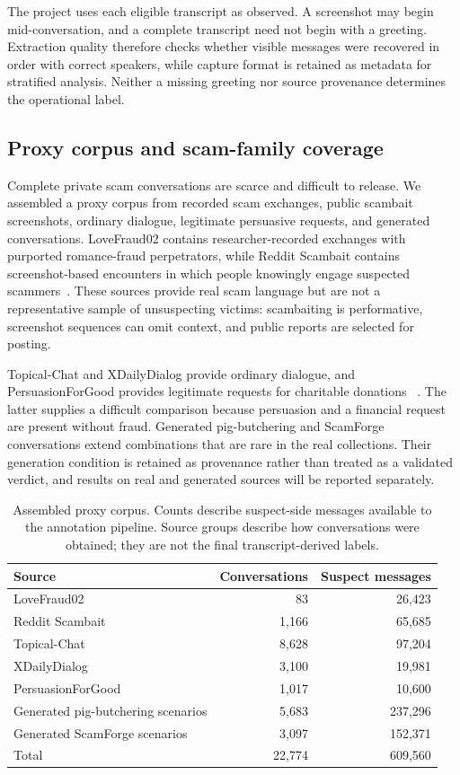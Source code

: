 \documentclass[letterpaper,11pt]{article}
\begin{document}
The project uses each eligible transcript as observed. A screenshot may begin
mid-conversation, and a complete transcript need not begin with a greeting.
Extraction quality therefore checks whether visible messages were recovered in
order with correct speakers, while capture format is retained as metadata for
stratified analysis. Neither a missing greeting nor source provenance determines
the operational label.

\subsection{Proxy corpus and scam-family coverage}
Complete private scam conversations are scarce and difficult to release. We
assembled a proxy corpus from recorded scam exchanges, public scambait screenshots,
ordinary dialogue, legitimate persuasive requests, and generated conversations.
LoveFraud02 contains researcher-recorded exchanges with purported romance-fraud
perpetrators, while Reddit Scambait contains screenshot-based encounters in which
people knowingly engage suspected scammers~\cite{faber2024lovefraud02,lu2026readthis}.
These sources provide real scam language but are not a representative sample of
unsuspecting victims: scambaiting is performative, screenshot sequences can omit
context, and public reports are selected for posting.

Topical-Chat and XDailyDialog provide ordinary dialogue, and PersuasionForGood
provides legitimate requests for charitable donations
~\cite{gopalakrishnan2019topical,li2017dailydialog,wang2019persuasion}.
The latter supplies a difficult comparison because persuasion and a financial
request are present without fraud. Generated pig-butchering and ScamForge
conversations extend combinations that are rare in the real collections. Their
generation condition is retained as provenance rather than treated as a validated
verdict, and results on real and generated sources will be reported separately.

\begin{table}[tb]
\centering\small
\begin{tabularx}{\linewidth}{@{}Xrr@{}}
\toprule
Source & Conversations & Suspect messages \\
\midrule
LoveFraud02 & 83 & 26,423 \\
Reddit Scambait & 1,166 & 65,685 \\
Topical-Chat & 8,628 & 97,204 \\
XDailyDialog & 3,100 & 19,981 \\
PersuasionForGood & 1,017 & 10,600 \\
Generated pig-butchering scenarios & 5,683 & 237,296 \\
Generated ScamForge scenarios & 3,097 & 152,371 \\
\midrule
Total & 22,774 & 609,560 \\
\bottomrule
\end{tabularx}
\caption{Assembled proxy corpus. Counts describe suspect-side messages available
to the annotation pipeline. Source groups describe how conversations were
obtained; they are not the final transcript-derived labels.}
\label{tab:data}
\end{table}
\end{document}
